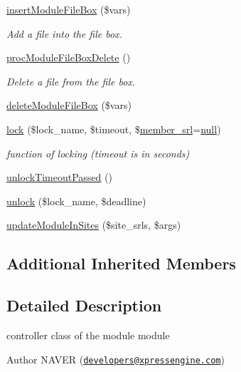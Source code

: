 \begin{DoxyCompactItemize}
\hyperlink{classmoduleController_a141cdf2d372314e8661c276cdb8bd889}{insert\+Module\+File\+Box} (\$vars)
\begin{DoxyCompactList}\small\item\em Add a file into the file box. \end{DoxyCompactList}\item 
\hyperlink{classmoduleController_a2b4e5ffa008e6a0a00bfe9844f475b0d}{proc\+Module\+File\+Box\+Delete} ()
\begin{DoxyCompactList}\small\item\em Delete a file from the file box. \end{DoxyCompactList}\item 
\hyperlink{classmoduleController_a26ff8a052af05f873237f3023e3e1bde}{delete\+Module\+File\+Box} (\$vars)
\item 
\hyperlink{classmoduleController_a1395c1be0ebed50078212640fba409be}{lock} (\$lock\+\_\+name, \$timeout, \$\hyperlink{ko_8install_8php_aa61f9e08f0fe505094d26f8143f30bbd}{member\+\_\+srl}=\hyperlink{modernizr_8min_8js_a286f9ec831c5e676eeb493248eab9575}{null})
\begin{DoxyCompactList}\small\item\em function of locking (timeout is in seconds) \end{DoxyCompactList}\item 
\hyperlink{classmoduleController_aac97ab294279631cb3cf1078063e8b56}{unlock\+Timeout\+Passed} ()
\item 
\hyperlink{classmoduleController_a79a5d8ecb0bc6186756e80144cbca92f}{unlock} (\$lock\+\_\+name, \$deadline)
\item 
\hyperlink{classmoduleController_a1d2d1c0845ee050c4f837dea9b9beab1}{update\+Module\+In\+Sites} (\$site\+\_\+srls, \$args)
\end{DoxyCompactItemize}
\subsection*{Additional Inherited Members}


\subsection{Detailed Description}
controller class of the module module 

\begin{DoxyAuthor}{Author}
N\+A\+V\+ER (\href{mailto:developers@xpressengine.com}{\tt developers@xpressengine.\+com}) 
\end{DoxyAuthor}


